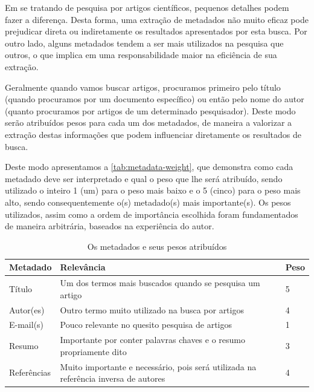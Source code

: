 
Em se tratando de pesquisa por artigos científicos, pequenos detalhes podem fazer a diferença. Desta forma, uma extração de metadados não muito eficaz pode prejudicar direta ou indiretamente os resultados apresentados por esta busca. Por outro lado, alguns metadados tendem a ser mais utilizados na pesquisa que outros, o que implica em uma responsabilidade maior na eficiência de sua extração. 


Geralmente quando vamos buscar artigos, procuramos primeiro pelo título (quando procuramos por um documento específico) ou então pelo nome do autor (quanto procuramos por artigos de um determinado pesquisador). Deste modo serão atribuídos pesos para cada um dos metadados, de maneira a valorizar a extração destas informações que podem influenciar diretamente os resultados de busca.

Deste modo apresentamos a \autoref{tab:metadata-weight}, que demonstra como cada metadado deve ser interpretado e qual o peso que lhe será atribuído, sendo utilizado o inteiro 1 (um) para o peso mais baixo e o 5 (cinco) para o peso mais alto, sendo consequentemente o(s) metadado(s) mais importante(s). Os pesos utilizados, assim como a ordem de importância escolhida foram fundamentados de maneira arbitrária, baseados na experiência do autor.


\begin{table}
    \caption{Os metadados e seus pesos atribuídos}
    \begin{center}
        \begin{tabular}{|p{3cm}|p{8cm}|C{1cm}|}
            \hline \textbf{Metadado} & \textbf{Relevância} & \textbf{Peso} \\ 
            \hline Título & Um dos termos mais buscados quando se pesquisa um artigo & 5 \\
            \hline Autor(es) & Outro termo muito utilizado na busca por artigos & 4 \\
            \hline E-mail(s) & Pouco relevante no quesito pesquisa de artigos & 1 \\
            \hline Resumo & Importante por conter palavras chaves e o resumo propriamente dito & 3 \\
            \hline Referências & Muito importante e necessário, pois será utilizada na referência inversa de autores & 4 \\
            \hline 
        \end{tabular} 
    \end{center}
    \label{tab:metadata-weight}
\end{table}

